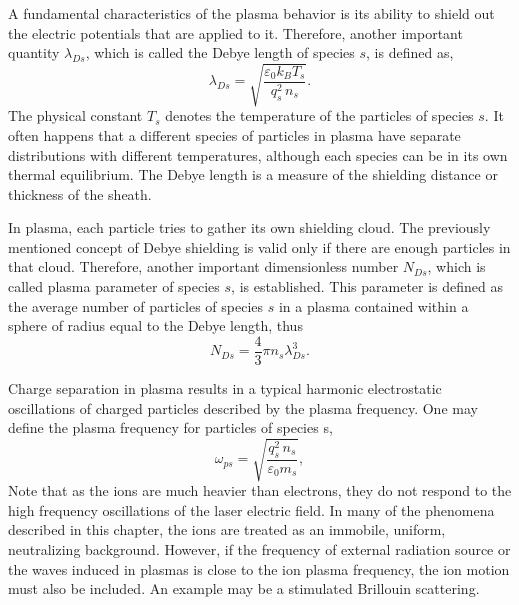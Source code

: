 A fundamental characteristics of the plasma behavior is its ability to shield out the electric potentials that are applied to it. Therefore, another important quantity $ \lambda_{Ds} $, which is called the Debye length of species $ s $, is defined as,
\begin{equation}
\label{2.1.3}
\lambda_{Ds} = \sqrt{\frac{\varepsilon_0 k_B T_s}{q_s^2 \, n_s}}.
\end{equation}
The physical constant $ T_s $ denotes the temperature of the particles of species $ s $. It often happens that a different species of particles in plasma have separate distributions with different temperatures, although each species can be in its own thermal equilibrium. The Debye length is a measure of the shielding distance or thickness of the sheath.

In plasma, each particle tries to gather its own shielding cloud. The previously mentioned concept of Debye shielding is valid only if there are enough particles in that cloud. Therefore, another important dimensionless number $ N_{Ds} $, which is called plasma parameter of species $ s $, is established. This parameter is defined as the average number of particles of species $ s $ in a plasma contained within a sphere of radius equal to the Debye length, thus
\begin{equation}
\label{2.1.4}
N_{Ds} = \frac{4}{3} \pi n_s \lambda_{Ds}^3. 
\end{equation}

Charge separation in plasma results in a typical harmonic electrostatic oscillations of charged particles described by the plasma frequency. One may define the plasma frequency for particles of species s,
\begin{equation}
\label{2.1.5}
\omega_{ps} = \sqrt{\frac{q_s^{2}\,n_s}{\varepsilon_0 m_s}},
\end{equation}
Note that as the ions are much heavier than electrons, they do not respond to the high frequency oscillations of the laser electric field. In many of the phenomena described in this chapter, the ions are treated as an immobile, uniform, neutralizing background. However, if the frequency of external radiation source or the waves induced in plasmas is close to the ion plasma frequency, the ion motion must also be included. An example may be a stimulated Brillouin scattering.

